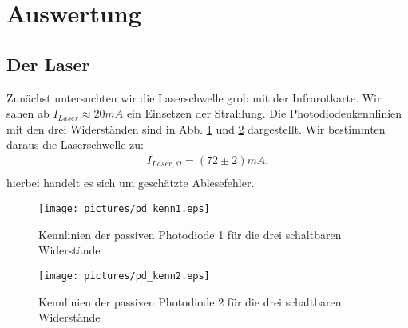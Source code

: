 \documentclass[12pt]{article}
\begin{document}
\section{Auswertung}
\subsection{Der Laser}
Zunächst untersuchten wir die Laserschwelle grob mit der Infrarotkarte. Wir sahen ab $I_{Laser} \approx 20 mA$ ein Einsetzen der Strahlung.
Die Photodiodenkennlinien mit den drei Widerständen sind in Abb. \ref{pdkennlinien1} und \ref{pdkennlinien2} dargestellt. Wir bestimmten daraus die Laserschwelle zu:
\begin{align*}
 I_{Laser, \Omega} = (72 \pm 2) mA. \\
\end{align*}
hierbei handelt es sich um geschätzte Ablesefehler.
\begin{figure}[H]
 \texttt{[image: pictures/pd\_kenn1.eps]}
 \caption{Kennlinien der passiven Photodiode 1 für die drei schaltbaren Widerstände}
 \label{pdkennlinien1}
\end{figure}
\begin{figure}[H]
 \texttt{[image: pictures/pd\_kenn2.eps]}
 \caption{Kennlinien der passiven Photodiode 2 für die drei schaltbaren Widerstände}
 \label{pdkennlinien2}
\end{figure}
\end{document}
